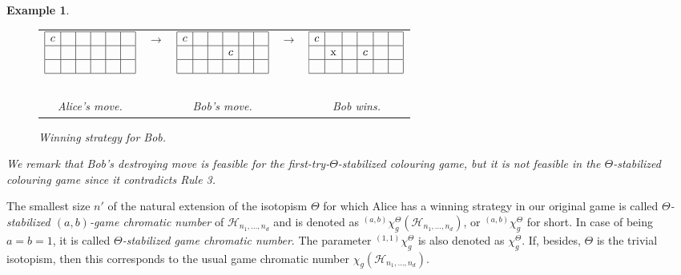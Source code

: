 \documentclass{article}
\newtheorem{example}[thm]{Example}
\newcommand{\gcnt}[4]{\ensuremath{{}^{({#1},{#2})}\chi_{g#4}^{\Theta}({#3})}}
\begin{document}
\begin{example}
\begin{figure}[htbp]
\begin{center}
\begin{tabular}{ccccc}
$\begin{array}{|c|c|c|c|c|c|}
\hline
c & \ &  \  &  \  & \  & \  \\ \hline
 & & & & &\\  \hline
 & & & & &\\  \hline
\end{array}$ & $\rightarrow$ & $\begin{array}{|c|c|c|c|c|c|}
\hline
c & \ &  \  &  \  & \  & \  \\ \hline
 & & & c & &\\  \hline
 & & & & &\\  \hline
\end{array}$& $\rightarrow$ & $\begin{array}{|c|c|c|c|c|c|}
\hline
c & \ &  \  &  \  & \  & \  \\ \hline
 & \mathrm{x} & & c & &\\  \hline
 & & & & &\\  \hline
\end{array}$\\ \ \\
Alice's move. & & Bob's move. & & Bob wins.\\
\end{tabular}
\end{center}
\caption{Winning strategy for Bob.}\label{Fig_6}
\end{figure}

We remark that Bob's destroying move is feasible for the first-try-$\Theta$-stabilized colouring game, but it is not feasible in the $\Theta$-stabilized colouring game since it 
contradicts 
Rule 3.
\end{example}

\hspace{0.1cm}

The smallest size $n'$ of the natural extension of the isotopism $\Theta$ for which Alice has a winning strategy in our original game is called {\em $\Theta$-stabilized $(a,b)$-game chromatic number} of $\mathcal{H}_{n_1,\ldots,n_d}$ and is denoted as $\gcnt{a}{b}{\mathcal{H}_{n_1,\ldots,n_d}}{}$, or ${}^{(a,b)}\chi_g^{\Theta}$ for short. In case of being $a=b=1$, it is called {\em $\Theta$-stabilized game chromatic number}. The parameter ${}^{(1,1)}\chi_g^{\Theta}$ is also denoted as $\chi_g^{\Theta}$. If, besides, $\Theta$ is the trivial isotopism, then this corresponds to the usual game chromatic number $\chi_g(\mathcal{H}_{n_1,\ldots,n_d})$.
\end{document}
